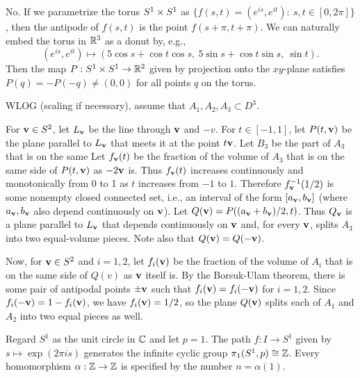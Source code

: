 No.  If we parametrize the torus $S^1\times S^1$ as $\{f(s,t)=(e^{is},e^{it}):\ s,t\in[0,2\pi]\}$, then the antipode of $f(s,t)$ is the point $f(s+\pi,t+\pi)$.  We can naturally embed the torus in $\mathbb{R}^3$ as a donut by, e.g.,
\[(e^{is},e^{it}) \mapsto (5\cos s+\cos t\cos s,\ 5\sin s+\cos t\sin s,\ \sin t).\]
Then the map $P:S^1\times S^1\to\mathbb{R}^2$ given by projection onto the $xy$-plane satisfies $P(q)=-P(-q)\neq(0,0)$ for all points $q$ on the torus.


\soln WLOG (scaling if necessary), assume that $A_1,A_2,A_3\subset D^3$.

For $\mathbf{v}\in S^2$, let $L_{\mathbf{v}}$ be the line through $\mathbf{v}$ and $-v$.  For $t\in[-1,1]$, let $P(t,\mathbf{v})$ be the plane parallel to $L_{\mathbf{v}}$ that meets it at the point $t\mathbf{v}$.  Let $B_3$ be the part of $A_3$ that is on the same 
Let $f_{\mathbf{v}}(t)$ be the fraction of the volume of $A_3$ that is on the same side of $P(t,\mathbf{v})$ as $-2\mathbf{v}$ is.  Thus $f_{\mathbf{v}}(t)$ increases continuously and monotonically from 0 to 1 as $t$ increases from $-1$ to $1$.  Therefore $f_{\mathbf{v}}^{-1}(1/2)$ is some nonempty closed connected set, i.e., an interval of the form $[a_{\mathbf{v}},b_{\mathbf{v}}]$ (where $a_{\mathbf{v}},b_{\mathbf{v}}$ also depend continuously on $\mathbf{v}$).  Let $Q(\mathbf{v})=P((a_{\mathbf{v}}+b_{\mathbf{v}})/2,t)$.  Thus $Q_{\mathbf{v}}$ is a plane parallel to $L_{\mathbf{v}}$ that depends continuously on $\mathbf{v}$ and, for every $\mathbf{v}$, splits $A_3$ into two equal-volume pieces.  Note also that $Q(\mathbf{v})=Q(-\mathbf{v})$.

Now, for $\mathbf{v}\in S^2$ and $i=1,2$, let $f_i(\mathbf{v})$ be the fraction of the volume of $A_i$ that is on the same side of $Q(v)$ as $\mathbf{v}$ itself is.  By the Borsuk-Ulam theorem, there is some pair of antipodal points $\pm\mathbf{v}$ such that $f_i(\mathbf{v})=f_i(-\mathbf{v})$ for $i=1,2$.  Since $f_i(-\mathbf{v})=1-f_i(\mathbf{v})$, we have $f_i(\mathbf{v})=1/2$, so the plane $Q(\mathbf{v})$ splits each of $A_1$ and $A_2$ into two equal pieces as well.


Regard $S^1$ as the unit circle in $\mathbb{C}$ and let $p=1$.  The path $f:I\to S^1$ given by $s\mapsto\exp(2\pi is)$ generates the infinite cyclic group $\pi_1(S^1,p)\cong\mathbb{Z}$.  Every homomorphism $\alpha:\mathbb{Z}\to\mathbb{Z}$ is specified by the number $n=\alpha(1)$.

